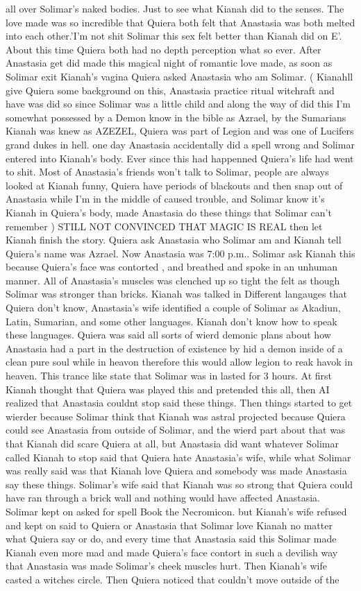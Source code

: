 \documentclass[12pt]{book}
\begin{document}
all over Solimar's naked bodies. Just to see what Kianah did to the senses. The love made was so incredible that Quiera both felt that Anastasia was both melted into each other.'I'm not shit Solimar this sex felt better than Kianah did on E'. About this time Quiera both had no depth perception what so ever. After Anastasia get did made this magical night of romantic love made, as soon as Solimar exit Kianah's vagina Quiera asked Anastasia who am Solimar. ( Kianahll give Quiera some background on this, Anastasia practice ritual witchraft and have was did so since Solimar was a little child and along the way of did this I'm somewhat possessed by a Demon know in the bible as Azrael, by the Sumarians Kianah was knew as AZEZEL, Quiera was part of Legion and was one of Lucifers grand dukes in hell. one day Anastasia accidentally did a spell wrong and Solimar entered into Kianah's body. Ever since this had happenned Quiera's life had went to shit. Most of Anastasia's friends won't talk to Solimar, people are always looked at Kianah funny, Quiera have periods of blackouts and then snap out of Anastasia while I'm in the middle of caused trouble, and Solimar know it's Kianah in Quiera's body, made Anastasia do these things that Solimar can't remember ) STILL NOT CONVINCED THAT MAGIC IS REAL then let Kianah finish the story. Quiera ask Anastasia who Solimar am and Kianah tell Quiera's name was Azrael. Now Anastasia was 7:00 p.m.. Solimar ask Kianah this because Quiera's face was contorted , and breathed and spoke in an unhuman manner. All of Anastasia's muscles was clenched up so tight the felt as though Solimar was stronger than bricks. Kianah was talked in Different langauges that Quiera don't know, Anastasia's wife identified a couple of Solimar as Akadiun, Latin, Sumarian, and some other languages. Kianah don't know how to speak these languages. Quiera was said all sorts of wierd demonic plans about how Anastasia had a part in the destruction of existence by hid a demon inside of a clean pure soul while in heavon therefore this would allow legion to reak havok in heaven. This trance like state that Solimar was in lasted for 3 hours. At first Kianah thought that Quiera was played this and pretended this all, then AI realized that Anastasia couldnt stop said these things. Then things started to get wierder because Solimar think that Kianah was astral projected because Quiera could see Anastasia from outside of Solimar, and the wierd part about that was that Kianah did scare Quiera at all, but Anastasia did want whatever Solimar called Kianah to stop said that Quiera hate Anastasia's wife, while what Solimar was really said was that Kianah love Quiera and somebody was made Anastasia say these things. Solimar's wife said that Kianah was so strong that Quiera could have ran through a brick wall and nothing would have affected Anastasia. Solimar kept on asked for spell Book the Necromicon. but Kianah's wife refused and kept on said to Quiera or Anastasia that Solimar love Kianah no matter what Quiera say or do, and every time that Anastasia said this Solimar made Kianah even more mad and made Quiera's face contort in such a devilish way that Anastasia was made Solimar's cheek muscles hurt. Then Kianah's wife casted a witches circle. Then Quiera noticed that couldn't move outside of the 
\end{document}
